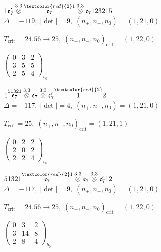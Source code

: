 \documentclass[10pt]{article}
\begin{document}
$1\mathfrak{e}_7'\overset{3,3}{\otimes}\overset{\textcolor{red}{2}1}{\mathfrak{e}_7}\overset{3,3}{\otimes}\mathfrak{e}_7123215$ \quad $\Delta=-119,\; |\det|=9,\; (n_+,n_-,n_0)=(1,21,0)$

\hspace{1em}$T_{\text{crit}}=24.56 \to 25,\; (n_+,n_-,n_0)_{\text{crit}}=(1,22,0)$

\hspace{2em}$\left(\begin{smallmatrix}0 & 3 & 2 \\ 3 & 5 & 5 \\ 2 & 5 & 4\end{smallmatrix}\right)_{\!b_0}$

\smallskip

$1\overset{51321}{\mathfrak{e}_7}\overset{3,3}{\otimes}\mathfrak{e}_7\overset{3,3}{\otimes}\mathfrak{e}_7'\overset{\textcolor{red}{2}}{1}2$ \quad $\Delta=-117,\; |\det|=4,\; (n_+,n_-,n_0)=(1,21,0)$

\hspace{1em}$T_{\text{crit}}=25,\; (n_+,n_-,n_0)_{\text{crit}}=(1,21,1)$

\hspace{2em}$\left(\begin{smallmatrix}0 & 2 & 2 \\ 2 & 0 & 2 \\ 2 & 2 & 4\end{smallmatrix}\right)_{\!b_0}$

$51321\overset{\textcolor{red}{2}1}{\mathfrak{e}_7}\overset{3,3}{\otimes}\mathfrak{e}_7\overset{3,3}{\otimes}\mathfrak{e}_7'12$ \quad $\Delta=-117,\; |\det|=9,\; (n_+,n_-,n_0)=(1,21,0)$

\hspace{1em}$T_{\text{crit}}=24.56 \to 25,\; (n_+,n_-,n_0)_{\text{crit}}=(1,22,0)$

\hspace{2em}$\left(\begin{smallmatrix}0 & 3 & 2 \\ 3 & 14 & 8 \\ 2 & 8 & 4\end{smallmatrix}\right)_{\!b_0}$

\smallskip
\end{document}
